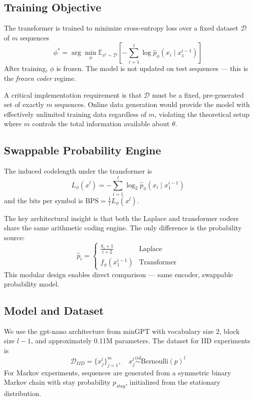 \documentclass[conference]{IEEEtran}
\begin{document}
\subsection{Training Objective}

The transformer is trained to minimize cross-entropy loss over a fixed dataset $\mathcal{D}$ of $m$ sequences
\begin{equation}
    \phi^* = \arg\min_\phi \mathbb{E}_{x^l \sim \mathcal{D}}\left[-\sum_{i=1}^l \log \hat{p}_\phi(x_i \mid x_1^{i-1})\right]
\end{equation}
After training, $\phi$ is frozen. The model is not updated on test sequences --- this is the \textit{frozen coder} regime.

A critical implementation requirement is that $\mathcal{D}$ must be a fixed, pre-generated set of exactly $m$ sequences. Online data generation would provide the model with effectively unlimited training data regardless of $m$, violating the theoretical setup where $m$ controls the total information available about $\theta$.

\subsection{Swappable Probability Engine}

The induced codelength under the transformer is
\begin{equation}
    L_\phi(x^l) = -\sum_{i=1}^l \log_2 \hat{p}_\phi(x_i \mid x_1^{i-1})
\end{equation}
and the bits per symbol is $\text{BPS} = \frac{1}{l}L_\phi(x^l)$.

The key architectural insight is that both the Laplace and transformer coders share the same arithmetic coding engine. The only difference is the probability source:
\begin{equation}
    \hat{p}_i = \begin{cases} \frac{k_i + 1}{i + 2} & \text{Laplace} \\ f_\phi(x_1^{i-1}) & \text{Transformer} \end{cases}
\end{equation}
This modular design enables direct comparison --- same encoder, swappable probability model.

\subsection{Model and Dataset}

We use the gpt-nano architecture from minGPT \cite{mingpt} with vocabulary size 2, block size $l-1$, and approximately 0.11M parameters. The dataset for IID experiments is
\begin{equation}
    \mathcal{D}_{IID} = \{x^l_j\}_{j=1}^m, \quad x^l_j \overset{iid}{\sim} \text{Bernoulli}(p)^l
\end{equation}
For Markov experiments, sequences are generated from a symmetric binary Markov chain with stay probability $p_{stay}$, initialized from the stationary distribution.
\end{document}
